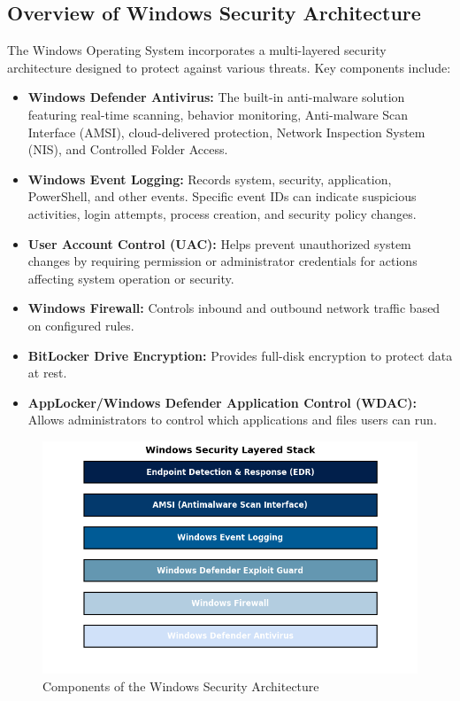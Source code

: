 \documentclass[11pt]{article}
\begin{document}
	\subsection{Overview of Windows Security Architecture}
	The Windows Operating System incorporates a multi-layered security architecture designed to protect against various threats. Key components include:
	\begin{itemize}
		\item \textbf{Windows Defender Antivirus:} The built-in anti-malware solution featuring real-time scanning, behavior monitoring, Anti-malware Scan Interface (AMSI), cloud-delivered protection, Network Inspection System (NIS), and Controlled Folder Access.
		\item \textbf{Windows Event Logging:} Records system, security, application, PowerShell, and other events. Specific event IDs can indicate suspicious activities, login attempts, process creation, and security policy changes.
		\item \textbf{User Account Control (UAC):} Helps prevent unauthorized system changes by requiring permission or administrator credentials for actions affecting system operation or security.
		\item \textbf{Windows Firewall:} Controls inbound and outbound network traffic based on configured rules.
		\item \textbf{BitLocker Drive Encryption:} Provides full-disk encryption to protect data at rest.
		\item \textbf{AppLocker/Windows Defender Application Control (WDAC):} Allows administrators to control which applications and files users can run.
	\end{itemize}
	
	\begin{figure}[H]
		\centering
		\includegraphics[width=\linewidth]{Pictures/windowssecuritylayer}
		\caption{Components of the Windows Security Architecture}
		\label{fig:windowssecuritylayer}
	\end{figure}
	
\end{document}
